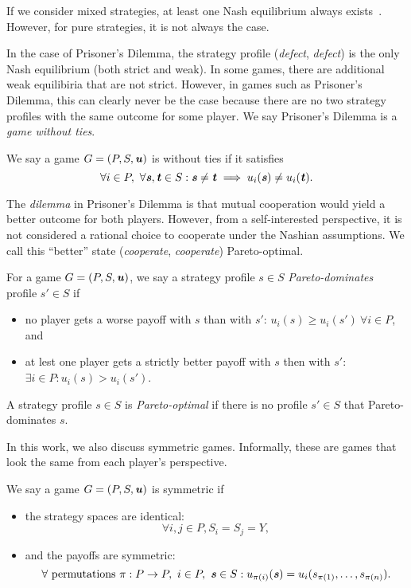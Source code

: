 If we consider mixed strategies, at least one Nash equilibrium always exists~\cite{Nash51}.
However, for pure strategies, it is not always the case.

In the case of Prisoner's Dilemma, the strategy profile (\textit{defect}, \textit{defect}) is the only Nash equilibrium (both strict and weak).
In some games, there are additional weak equilibiria that are not strict.
However, in games such as Prisoner's Dilemma, this can clearly never be the case because there are no two strategy profiles with the same outcome for some player.
We say Prisoner's Dilemma is a \textit{game without ties}.

\begin{definition}
  We say a game $G = (P, S, \boldsymbol{\mathit{u}})$ is without ties if it satisfies
  \[
    \forall i \in P,\ \forall \boldsymbol{\mathit{s}}, \boldsymbol{\mathit{t}} \in S: \boldsymbol{\mathit{s}} \ne \boldsymbol{\mathit{t}} \implies u_i(\boldsymbol{\mathit{s}}) \ne u_i(\boldsymbol{\mathit{t}}).
  \]
\end{definition}

The \textit{dilemma} in Prisoner's Dilemma is that mutual cooperation would yield a better outcome for both players.
However, from a self-interested perspective, it is not considered a rational choice to cooperate under the Nashian assumptions.
We call this \enquote{better} state (\textit{cooperate}, \textit{cooperate}) Pareto-optimal.

\begin{definition}
  For a game $G = (P, S, \boldsymbol{\mathit{u}})$, we say a strategy profile $s \in S$ \textit{Pareto-dominates} profile $s' \in S$ if
  \begin{itemize}
    \item no player gets a worse payoff with $s$ than with $s'$: $u_i(s) \ge u_i(s')\ \forall i \in P$, and
    \item at lest one player gets a strictly better payoff with $s$ then with $s'$: $\exists i \in P: u_i(s) > u_i(s')$.
  \end{itemize}
  A strategy profile $s \in S$ is \textit{Pareto-optimal} if there is no profile $s' \in S$ that Pareto-dominates $s$.
\end{definition}

In this work, we also discuss symmetric games.
Informally, these are games that look the same from each player's perspective.

\begin{definition}
  We say a game $G = (P, S, \boldsymbol{\mathit{u}})$ is symmetric if
  \begin{itemize}
    \item the strategy spaces are identical:
    $$\forall i, j \in P, S_i = S_j = Y,$$
    \item and the payoffs are symmetric:
    $$\forall \text{ permutations } \pi: P \to P,\ i \in P,\ \boldsymbol{\mathit{s}} \in S: u_{\pi(i)}(\boldsymbol{\mathit{s}}) = u_i(s_{\pi(1)}, \dots, s_{\pi(n)}).$$
\end{itemize}
\end{definition}

